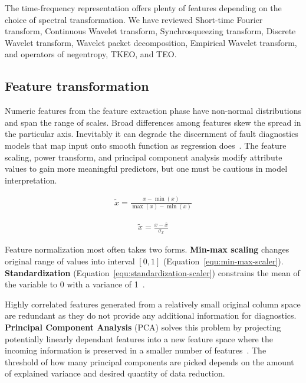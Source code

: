 The time-frequency representation offers plenty of features depending on the choice of spectral transformation. We have reviewed Short-time Fourier transform, Continuous Wavelet transform, Synchrosqueezing transform, Discrete Wavelet transform, Wavelet packet decomposition, Empirical Wavelet transform, and operators of negentropy, TKEO, and TEO.

\subsection{Feature transformation}
Numeric features from the feature extraction phase have non-normal distributions and span the range of scales. Broad differences among features skew the spread in the particular axis. Inevitably it can degrade the discernment of fault diagnostics models that map input onto smooth function as regression does~\cite{zheng_feature_2018}. The feature scaling, power transform, and principal component analysis modify attribute values to gain more meaningful predictors, but one must be cautious in model interpretation.

\begin{ceqn}\begin{align}
\widetilde{x} = \frac{x - \min(x)}{\max(x) - \min(x)}
\label{equ:min-max-scaler}
\end{align}\end{ceqn}

\begin{ceqn}\begin{align}
\widetilde{x} = \frac{x - \bar{x}}{\sigma_x}
\label{equ:standardization-scaler}
\end{align}\end{ceqn}

Feature normalization most often takes two forms. \textbf{Min-max scaling} changes original range of values into interval $[0, 1]$ (Equation~\ref{equ:min-max-scaler}). \textbf{Standardization} (Equation~\ref{equ:standardization-scaler}) constrains the mean of the variable to 0 with a variance of 1~\cite{zheng_feature_2018}.

Highly correlated features generated from a relatively small original column space are redundant as they do not provide any additional information for diagnostics. \textbf{Principal Component Analysis} (PCA) solves this problem by projecting potentially linearly dependant features into a new feature space where the incoming information is preserved in a smaller number of features~\cite{zheng_feature_2018}. The threshold of how many principal components are picked depends on the amount of explained variance and desired quantity of data reduction. 

